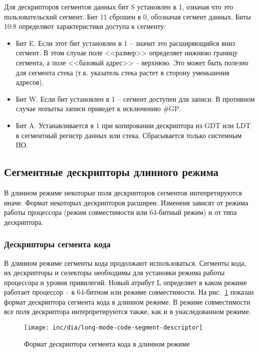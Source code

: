 Для дескрипторов сегментов данных бит S установлен в 1, означая что это пользовательский сегмент. Бит 11
сброшен в 0, обозначая сегмент данных. Биты 10:8 определяют характеристики доступа к сегменту:
\begin{itemize}
	\item Бит E. Если этот бит установлен в 1 -- значит это расширяющийся вниз сегмент. В этом случае
		поле <<размер>> определяет нижнюю границу сегмента, а поле <<базовый адрес>> -- верхнюю.
		Это может быть полезно для сегмента стека (т.к. указатель стека растет в сторону уменьшения адресов).
	\item Бит W. Если бит установлен в 1 -- сегмент доступен для записи. В противном случае попытка записи
		приведет к исключению \#GP.
	\item Бит A. Устанавливается в 1 при копировании дескриптора из GDT или LDT в сегментный регистр данных или стека.
		Сбрасывается только системным ПО.
\end{itemize}

\subsection{Сегментные дескрипторы длинного режима}
В длинном режиме некоторые поля дескрипторов сегментов интепретируются иначе. Формат некоторых дескрипторов расширен.
Изменеия зависят от режима работы процессора (режим совместимости или 64-битный режим) и от типа дескриптора.

\subsubsection*{Дескрипторы сегмента кода}
В длинном режиме сегменты кода продолжают использоваться. Сегменты кода, их дескрипторы и селекторы
необходимы для установки режима работы процессора и уровня привилегий. Новый атрибут L определяет в
каком режиме работает процессор -- в 64-битном или режиме совместимости. На рис.~\ref{fig:long-mode-code-segment-descriptor-format}
показан формат дескриптора сегмента кода в длинном режиме. В режиме совместимости все поля дескриптора
интерпретируются также, как и в унаследованном режиме.

\begin{figure}[ht]
  \centering
  \texttt{[image: inc/dia/long-mode-code-segment-descriptor]}
  \caption{Формат дескриптора сегмента кода в длинном режиме}
  \label{fig:long-mode-code-segment-descriptor-format}
\end{figure}

